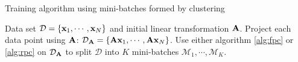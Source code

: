 \begin{algorithm} 
	\caption{Training algorithm using mini-batches formed by clustering} 
	\label{alg:mini-batches}  
	\begin{algorithmic} [1]                 %
		\REQUIRE Data set $\mathcal{D}=\{\mathbf{x}_1,\cdots,\mathbf{x}_N\}$ and initial linear
transformation $\mathbf{A}$.
		\REPEAT
			\STATE Project each data point using $\mathbf{A}$: 
$\mathcal{D}_{\mathbf{A}}=\{\mathbf{A}\mathbf{x}_1,\cdots,\mathbf{A}\mathbf{x}_N\}$.
			\STATE Use either algorithm \ref{alg:fpc} or \ref{alg:rpc} on
$\mathcal{D}_{\mathbf{A}}$ to split $\mathcal{D}$  into $K$ mini-batches
$\mathcal{M}_1,\cdots,\mathcal{M}_K$.
			\ENDFOR
	\end{algorithmic}
\end{algorithm}

